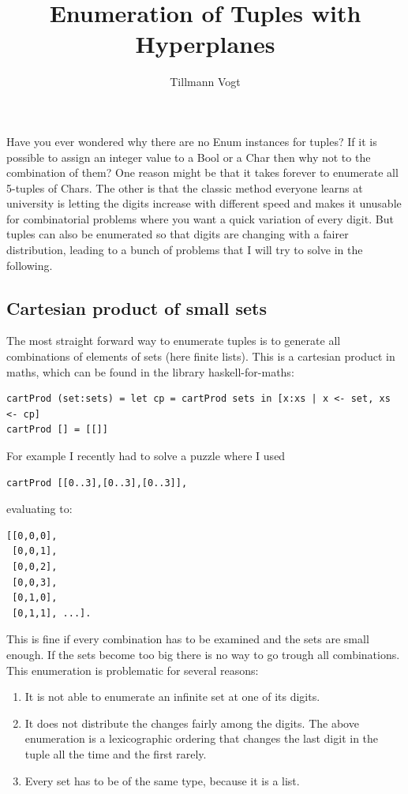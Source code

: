 \documentclass{tmr}
\title{Enumeration of Tuples with Hyperplanes} %
\author{Tillmann Vogt\email{tillk.vogt@googlemail.com}}
\begin{document}
 

\begin{introduction}
Have you ever wondered why there are no Enum instances for tuples? If it is possible to assign an integer value to a Bool or a Char then why not to the combination of them? One reason might be that it takes forever to enumerate all 5-tuples of Chars. The other is that the classic method everyone learns at university is letting the digits increase with different speed and makes it unusable for combinatorial problems where you want a quick variation of every digit.  But tuples can also be enumerated so that digits are changing with a fairer distribution, leading to a bunch of problems that I will try to solve in the following.
\end{introduction}

\subsection{ Cartesian product of small sets}

The most straight forward way to  enumerate tuples is to generate all combinations of elements of sets (here finite lists). This is a cartesian product in maths, which can be found in the library haskell-for-maths:
\begin{Verbatim}
cartProd (set:sets) = let cp = cartProd sets in [x:xs | x <- set, xs <- cp]
cartProd [] = [[]]
\end{Verbatim}

For example I recently had to solve a puzzle where I used 

\begin{Verbatim}
cartProd [[0..3],[0..3],[0..3]],
\end{Verbatim}
evaluating to:
\begin{Verbatim}
[[0,0,0],
 [0,0,1],
 [0,0,2],
 [0,0,3],
 [0,1,0],
 [0,1,1], ...].
\end{Verbatim}

This is fine if every combination has to be examined and the sets are small enough. If the sets become too big there is no way to go trough all combinations. This enumeration is problematic for several reasons:
\begin{enumerate}
\item It is not able to enumerate an infinite set at one of its digits.
\item It does not distribute the changes fairly among the digits. The above enumeration is a lexicographic ordering that changes the last digit in the tuple all the time and the first rarely.
\item Every set has to be of the same type, because it is a list.
\end{enumerate}
\end{document}
